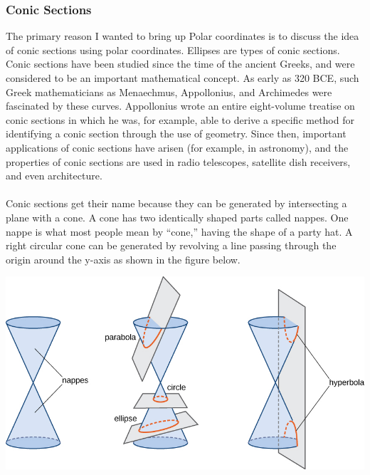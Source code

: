 \documentclass[12pt,addpoints]{exam}
\begin{document}
	\subsubsection*{Conic Sections}
	The primary reason I wanted to bring up Polar coordinates is to discuss the idea of conic sections using polar coordinates. Ellipses are types of conic sections. Conic sections have been studied since the time of the ancient Greeks, and were considered to be an important mathematical concept. As early as 320 BCE, such Greek mathematicians as Menaechmus, Appollonius, and Archimedes were fascinated by these curves. Appollonius wrote an entire eight-volume treatise on conic sections in which he was, for example, able to derive a specific method for identifying a conic section through the use of geometry. Since then, important applications of conic sections have arisen (for example, in astronomy), and the properties of conic sections are used in radio telescopes, satellite dish receivers, and even architecture. \\ \\
	Conic sections get their name because they can be generated by intersecting a plane with a cone. A cone has two identically shaped parts called nappes. One nappe is what most people mean by “cone,” having the shape of a party hat. A right circular cone can be generated by revolving a line passing through the origin around the y-axis as shown in the figure below.
	\begin{center}
		\includegraphics[scale=1.0]{cones.png}
	\end{center}
\end{document}
